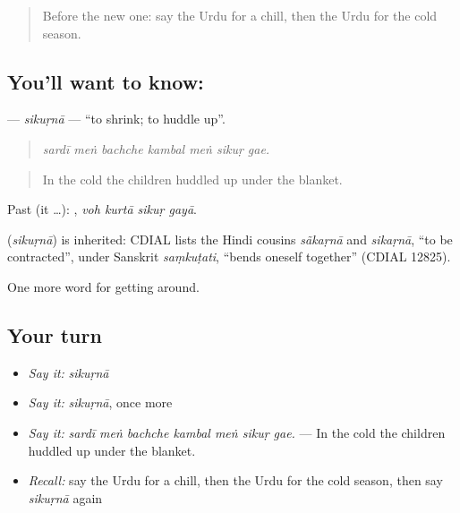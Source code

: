 \label{lesson:UR-C429-sikurna}



\begin{quote}
Before the new one: say the Urdu for a chill, then the Urdu for the cold season.
\end{quote}

\subsection*{You'll want to know: }
\textbf{} — \emph{sikuṛnā} — \textquotedblleft{}to shrink; to huddle up\textquotedblright{}.

\begin{quote}
      
\end{quote}

\begin{quote}
\emph{sardī meṅ bachche kambal meṅ sikuṛ gae.}
\end{quote}

\begin{quote}
In the cold the children huddled up under the blanket.
\end{quote}

Past (it …):    , \emph{voh kurtā sikuṛ gayā}.

\begin{cousinweb}
\textbf{} (\emph{sikuṛnā}) is inherited: CDIAL lists the Hindi cousins \emph{sãkaṛnā} and \emph{sikaṛnā}, \textquotedblleft{}to be contracted\textquotedblright{}, under Sanskrit \emph{saṃkuṭati}, \textquotedblleft{}bends oneself together\textquotedblright{} (CDIAL 12825).
\end{cousinweb}

\begin{grammarlens}[title={What you've built}]
One more word for getting around.
\end{grammarlens}

\subsection*{Your turn}
\begin{itemize}
\raggedright
  \item \emph{Say it:} \emph{sikuṛnā}
  \item \emph{Say it:} \emph{sikuṛnā}, once more
  \item \emph{Say it:} \emph{sardī meṅ bachche kambal meṅ sikuṛ gae.} — In the cold the children huddled up under the blanket.
  \item \emph{Recall:} say the Urdu for a chill, then the Urdu for the cold season, then say \emph{sikuṛnā} again
\end{itemize}

